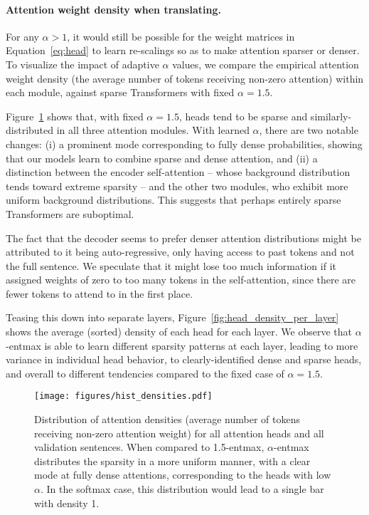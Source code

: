 \documentclass[11pt,a4paper]{article}
\newcommand{\figref}[1]{Figure~\ref{fig:#1}}
\newcommand*\entmaxtext{entmax\xspace}
\begin{document}
\paragraph{Attention weight density when translating.}
For any $\alpha>1$, it would still be possible for the weight
matrices in Equation~\ref{eq:head} to learn re-scalings so as to make
attention sparser or denser. To visualize the impact of adaptive
$\alpha$ values, we compare the empirical attention weight density
(the average number of tokens receiving non-zero attention) within
each module, against sparse Transformers with fixed $\alpha=1.5$.

\figref{hist_densities} shows that, with fixed $\alpha=1.5$, heads
tend to be sparse and similarly-distributed in all three attention
modules. With learned $\alpha$, there are two notable changes: (i) a
prominent mode corresponding to fully dense probabilities, showing
that our models learn to combine sparse and dense attention, and (ii)
a distinction between the encoder self-attention -- whose background
distribution tends toward extreme sparsity -- and the other two
modules, who exhibit more uniform background distributions. This
suggests that perhaps entirely sparse Transformers are suboptimal.

The fact that the decoder seems to prefer denser attention
distributions might be attributed to it being auto-regressive, only
having access to past tokens and not the full sentence. We speculate
that it might lose too much information if it assigned weights of
zero to too many tokens in the self-attention, since there are fewer
tokens to attend to in the first place.

Teasing this down into separate layers,
\figref{head_density_per_layer} shows the average (sorted) density of
each head for each layer. We observe that $\alpha$-\entmaxtext{} is
able to learn different sparsity patterns at each layer, leading to
more variance in individual head behavior, to clearly-identified
dense and sparse heads, and overall to different tendencies compared
to the fixed case of $\alpha=1.5$.

\begin{figure}[t]
    \centering
        \texttt{[image: figures/hist\_densities.pdf]}
        \caption{\label{fig:hist_densities}
    Distribution of attention densities (average number of tokens
    receiving non-zero attention weight) for all attention heads and all
    validation sentences.
    When compared to 1.5-\entmaxtext{}, $\alpha$-\entmaxtext{}
    distributes the sparsity in a more uniform manner, with a clear mode
    at fully dense attentions, corresponding to the heads with low
    $\alpha$. In the softmax case, this distribution would lead to a
    single bar with density 1.}
\end{figure}
\end{document}
